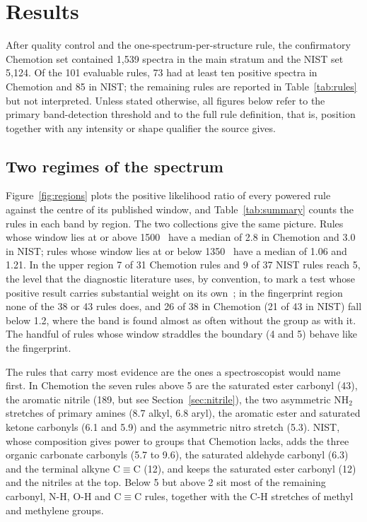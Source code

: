 \section{Results}
\label{sec:results}

After quality control and the one-spectrum-per-structure rule, the confirmatory Chemotion set contained 1,539 spectra in the main stratum and the NIST set 5,124. Of the 101 evaluable rules, 73 had at least ten positive spectra in Chemotion and 85 in NIST; the remaining rules are reported in Table~\ref{tab:rules} but not interpreted. Unless stated otherwise, all figures below refer to the primary band-detection threshold and to the full rule definition, that is, position together with any intensity or shape qualifier the source gives.

\subsection{Two regimes of the spectrum}
\label{sec:regimes}

Figure~\ref{fig:regions} plots the positive likelihood ratio of every powered rule against the centre of its published window, and Table~\ref{tab:summary} counts the rules in each \LRp{} band by region. The two collections give the same picture. Rules whose window lies at or above 1500~\wn{} have a median \LRp{} of 2.8 in Chemotion and 3.0 in NIST; rules whose window lies at or below 1350~\wn{} have a median of 1.06 and 1.21. In the upper region 7 of 31 Chemotion rules and 9 of 37 NIST rules reach \LRp{} 5, the level that the diagnostic literature uses, by convention, to mark a test whose positive result carries substantial weight on its own~\cite{deeks2004likelihood}; in the fingerprint region none of the 38 or 43 rules does, and 26 of 38 in Chemotion (21 of 43 in NIST) fall below 1.2, where the band is found almost as often without the group as with it. The handful of rules whose window straddles the boundary (4 and 5) behave like the fingerprint.

The rules that carry most evidence are the ones a spectroscopist would name first. In Chemotion the seven rules above \LRp{} 5 are the saturated ester carbonyl (43), the aromatic nitrile (189, but see Section~\ref{sec:nitrile}), the two asymmetric NH$_2$ stretches of primary amines (8.7 alkyl, 6.8 aryl), the aromatic ester and saturated ketone carbonyls (6.1 and 5.9) and the asymmetric nitro stretch (5.3). NIST, whose composition gives power to groups that Chemotion lacks, adds the three organic carbonate carbonyls (5.7 to 9.6), the saturated aldehyde carbonyl (6.3) and the terminal alkyne C$\equiv$C (12), and keeps the saturated ester carbonyl (12) and the nitriles at the top. Below 5 but above 2 sit most of the remaining carbonyl, N-H, O-H and C$\equiv$C rules, together with the C-H stretches of methyl and methylene groups.

